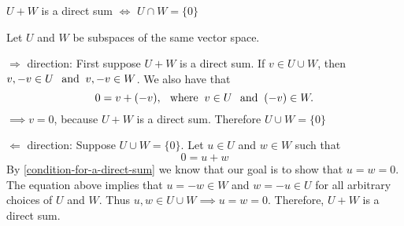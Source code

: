 \setcounter{thm}{45}
\begin{thm}
  \label{intersection-of-two-direct-sum-of-two-subscpaces}
  $U+W$ is a direct sum $\iff$ $U \cap W = \{0\}$
\end{thm}
\begin{prf} Let $U$ and $W$ be subspaces of the same vector space.
  \begin{description}
    \item{$\Rightarrow$ direction:} First suppose $U+W$ is a direct sum. If $v \in U \cup W$, then $v, -v \in U \;\;\, \text{and}\;\; v, -v \in W$. We also have that
    \begin{equation}
      0 = v + (-v), \;\;\, \text{where}\;\; v\in U \;\;\, \text{and}\;\; (-v) \in W.
    \end{equation}
    $\implies v=0$, because $U+W$  is a direct sum. Therefore $U \cup W = \{0\}$
    \item{$\Leftarrow$ direction:} Suppose $U\cup W = \{0\}$. Let  $u\in U$ and $w \in W$ such that
    \begin{equation}
      0 = u+w
    \end{equation}
    By \ref{condition-for-a-direct-sum} we know that our goal is to show that $u=w=0$. The equation above implies that $u=-w\in W$  and $w=-u \in U$ for all arbitrary choices of $U$ and $W$. Thus $u,w \in U\cup W \implies u=w=0.$ Therefore, $U+W$ is a direct sum.
  \end{description}

\end{prf}
